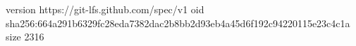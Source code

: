 version https://git-lfs.github.com/spec/v1
oid sha256:664a291b6329fc28eda7382dac2b8bb2d93eb4a45d6f192c94220115e23c4c1a
size 2316
